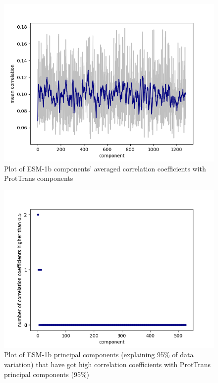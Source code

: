 \documentclass[12pt]{article}
\begin{document}
	\newpage

	\begin{figure}[h!]
		\centering
		\includegraphics[scale=0.85]{validation_small_set_2_joined_correlation_mean.png}

		\caption{Plot of ESM-1b components' averaged  correlation coefficients 
		with ProtTrans components}
		\label{figure:correlationComponentsMean}
	\end{figure}

	\newpage

	\begin{figure}[h!]
		\centering
		\includegraphics[scale=0.85]{validation_small_set_2_joined_PC_95_correlation_high_corr.png}

		\caption{Plot of ESM-1b principal components (explaining 
		95\% of data variation) that have got high correlation coefficients 
		with ProtTrans principal components (95\%)}
		\label{figure:highCorrelationComponentsPC95}
	\end{figure}
\end{document}
